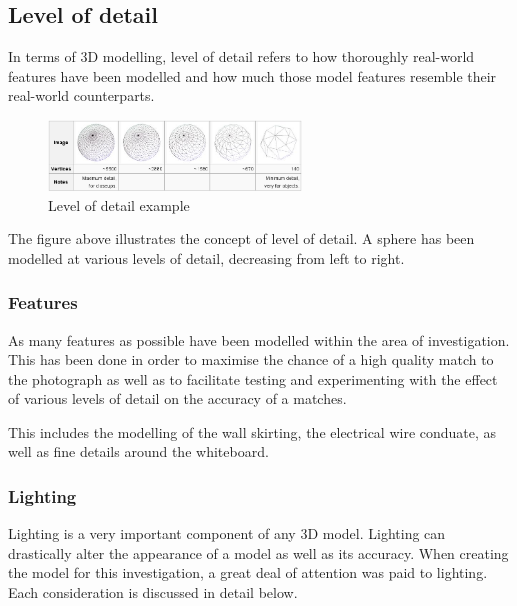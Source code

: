 \documentclass[11pt,a4paper]{report}
\begin{document}
		\subsection{Level of detail}
			In terms of 3D modelling, level of detail refers to how thoroughly real-world features have been modelled and how much those model features resemble their real-world counterparts.
			
			\begin{figure}[h!]
				\centering
				\includegraphics[width=0.6\textwidth]{level_of_detail_example}
				\caption{Level of detail example}
			\end{figure}
			
			The figure above illustrates the concept of level of detail. A sphere has been modelled at various levels of detail, decreasing from left to right.
			
			\subsubsection{Features}
				As many features as possible have been modelled within the area of investigation. This has been done in order to maximise the chance of a high quality match to the photograph as well as to facilitate testing and experimenting with the effect of various levels of detail on the accuracy of a matches. 
				
				
				This includes the modelling of the wall skirting, the electrical wire conduate, as well as fine details around the whiteboard. 
				
			
			\subsubsection{Lighting}
				Lighting is a very important component of any 3D model. Lighting can drastically alter the appearance of a model as well as its accuracy. When creating the model for this investigation, a great deal of attention was paid to lighting. Each consideration is discussed in detail below. 
				
\end{document}
